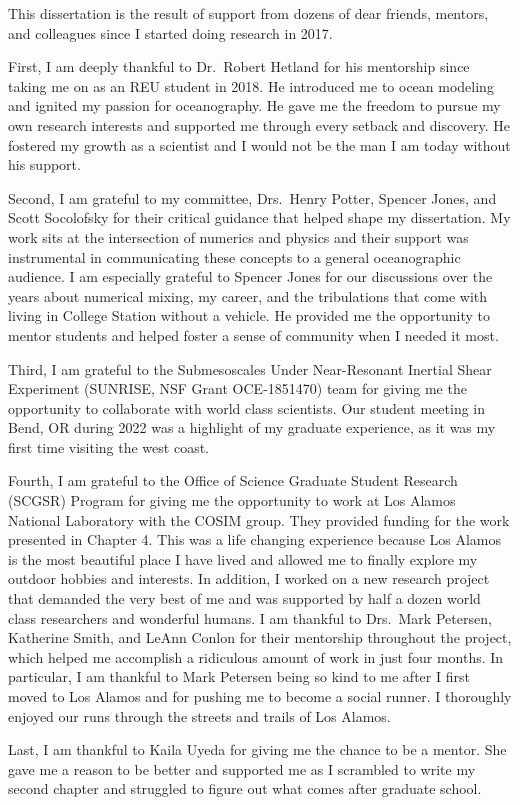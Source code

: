 
\begin{acknowledgements}
This dissertation is the result of support from dozens of dear friends, mentors, and colleagues since I started doing research in 2017.

First, I am deeply thankful to Dr.~Robert Hetland for his mentorship since taking me on as an REU student in 2018. He introduced me to ocean modeling and ignited my passion for oceanography. He gave me the freedom to pursue my own research interests and supported me through every setback and discovery. He fostered my growth as a scientist and I would not be the man I am today without his support. 

Second, I am grateful to my committee, Drs.~Henry Potter, Spencer Jones, and Scott Socolofsky for their critical guidance that helped shape my dissertation. My work sits at the intersection of numerics and physics and their support was instrumental in communicating these concepts to a general oceanographic audience. I am especially grateful to Spencer Jones for our discussions over the years about numerical mixing, my career, and the tribulations that come with living in College Station without a vehicle. He provided me the opportunity to mentor students and helped foster a sense of community when I needed it most. 

Third, I am grateful to the Submesoscales Under Near-Resonant Inertial Shear Experiment (SUNRISE, NSF Grant OCE-1851470) team for giving me the opportunity to collaborate with world class scientists. Our student meeting in Bend, OR during 2022 was a highlight of my graduate experience, as it was my first time visiting the west coast. 

Fourth, I am grateful to the Office of Science Graduate Student Research (SCGSR) Program for giving me the opportunity to work at Los Alamos National Laboratory with the COSIM group. They provided funding for the work presented in Chapter 4. This was a life changing experience because Los Alamos is the most beautiful place I have lived and allowed me to finally explore my outdoor hobbies and interests. In addition, I worked on a new research project that demanded the very best of me and was supported by half a dozen world class researchers and wonderful humans. I am thankful to Drs.~Mark Petersen, Katherine Smith, and LeAnn Conlon for their mentorship throughout the project, which helped me accomplish a ridiculous amount of work in just four months. In particular, I am thankful to Mark Petersen being so kind to me after I first moved to Los Alamos and for pushing me to become a social runner. I thoroughly enjoyed our runs through the streets and trails of Los Alamos. 

Last, I am thankful to Kaila Uyeda for giving me the chance to be a mentor. She gave me a reason to be better and supported me as I scrambled to write my second chapter and struggled to figure out what comes after graduate school. 
\end{acknowledgements}